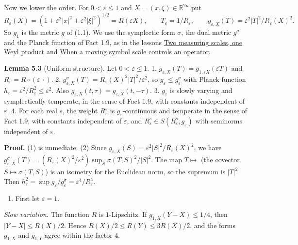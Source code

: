 \documentclass[
  11pt,
]{article}
\providecommand{\tightlist}{%
  \setlength{\itemsep}{0pt}\setlength{\parskip}{0pt}}
\begin{document}
Now we lower the order. For \(0<\varepsilon\le1\) and
\(X=(x,\xi)\in\mathbb R^{2n}\) put \[
R_\varepsilon(X)=(1+\varepsilon^2|x|^2+\varepsilon^2|\xi|^2)^{1/2}=R(\varepsilon X),\qquad
T_\varepsilon=1/R_\varepsilon,\qquad
g_{\varepsilon,X}(T)=\varepsilon^2|T|^2/R_\varepsilon(X)^2 .
\] So \(g_1\) is the metric \(g\) of (1.1). We use the symplectic form
\(\sigma\), the dual metric \(g^\sigma\) and the Planck function of Fact
1.9, as in the lessons \href{weyl-metric-products.pdf}{Two measuring
scales, one Weyl product} and \href{metric-operator-bounds.pdf}{When a
moving symbol scale controls an operator}.

\textbf{Lemma 5.3} (Uniform structure). Let \(0<\varepsilon\le1\). 1.
\(g_{\varepsilon,X}(T)=g_{1,\varepsilon X}(\varepsilon T)\) and
\(R_\varepsilon=R\circ(\varepsilon\,\cdot)\). 2.
\(g^\sigma_{\varepsilon,X}(T)=R_\varepsilon(X)^2|T|^2/\varepsilon^2\),
so \(g_\varepsilon\le g_\varepsilon^\sigma\) with Planck function
\(h_\varepsilon=\varepsilon^2/R_\varepsilon^2\le\varepsilon^2\). Also
\(g_{\varepsilon,X}(t,\tau)=g_{\varepsilon,X}(t,-\tau)\). 3.
\(g_\varepsilon\) is slowly varying and symplectically temperate, in the
sense of Fact 1.9, with constants independent of \(\varepsilon\). 4. For
each real \(s\), the weight \(R_\varepsilon^s\) is
\(g_\varepsilon\)-continuous and temperate in the sense of Fact 1.9,
with constants independent of \(\varepsilon\), and
\(R_\varepsilon^s\in S(R_\varepsilon^s,g_\varepsilon)\) with seminorms
independent of \(\varepsilon\).

{\footnotesize\sloppy
\textbf{Proof.} (1) is immediate. (2) Since
\(g_{\varepsilon,X}(S)=\varepsilon^2|S|^2/R_\varepsilon(X)^2\), we have
\(g^\sigma_{\varepsilon,X}(T)=(R_\varepsilon(X)^2/\varepsilon^2)\sup_S\sigma(T,S)^2/|S|^2\).
The map \(T\mapsto\) (the covector \(S\mapsto\sigma(T,S)\)) is an
isometry for the Euclidean norm, so the supremum is \(|T|^2\). Then
\(h_\varepsilon^2=\sup g_\varepsilon/g_\varepsilon^\sigma=\varepsilon^4/R_\varepsilon^4\).
\par}

\begin{enumerate}
\def\labelenumi{(\arabic{enumi})}
\setcounter{enumi}{2}
\tightlist
\item
  First let \(\varepsilon=1\).
\end{enumerate}

\emph{Slow variation.} The function \(R\) is \(1\)-Lipschitz. If
\(g_{1,X}(Y-X)\le1/4\), then \(|Y-X|\le R(X)/2\). Hence
\(R(X)/2\le R(Y)\le3R(X)/2\), and the forms \(g_{1,X}\) and \(g_{1,Y}\)
agree within the factor \(4\).
\end{document}
